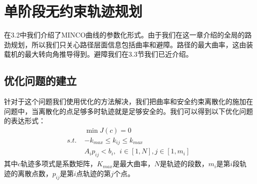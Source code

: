 \documentclass[master,academic]{ysuthesis} %
\begin{document}
	\section{单阶段无约束轨迹规划}
	在3.2中我们介绍了MINCO曲线的参数化形式。由于我们在这一章介绍的全局的路劲规划，所以我们只关心路径层面信息包括曲率和避障。路径的最大曲率，这由装载机的最大转向角推导得到。避障我们在3.3节我们已近介绍。
		\subsection{优化问题的建立}
		针对于这个问题我们使用优化的方法解决，我们把曲率和安全约束离散化的施加在问题中，当离散化的点足够多时轨迹就是足够安全的。我们可以得到以下优化问题的表达形式：
		\begin{equation}
			\begin{aligned}
				&\min J( c )=0 \\
				s.t.\,\,&-k_{max}\le k_{ij}\le k_{max} \\
				&A_ip_{ij}<b_i,\ \ i\in \left[ 1,N \right] ,j\in \left[ 1,m_i \right] 
			\end{aligned}
		\end{equation}
		其中$c$轨迹多项式是系数矩阵，$K_{max}$是最大曲率，$N$是轨迹的段数，$m_i$是第$i$段轨迹的离散点数，$p_{ij}$是第$i$点轨迹的第$j$个点。
\end{document}
